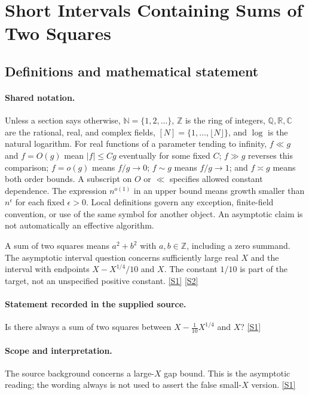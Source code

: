 \documentclass[11pt,a4paper]{article}
\newcommand{\N}{\mathbb{N}}
\newcommand{\Z}{\mathbb{Z}}
\newcommand{\Q}{\mathbb{Q}}
\newcommand{\R}{\mathbb{R}}
\newcommand{\C}{\mathbb{C}}
\newcommand{\sref}[2]{\hyperlink{source:#1:#2}{[S#2]}}
\begin{document}
\section{Short Intervals Containing Sums of Two Squares}\label{statement}


\subsection{Definitions and mathematical statement}

\paragraph{Shared notation.}Unless a section says otherwise, $\N=\{1,2,\ldots\}$,
$\Z$ is the ring of integers, $\Q,\R,\C$ are the rational, real, and complex
fields, $[N]=\{1,\ldots,\lfloor N\rfloor\}$, and $\log$ is the natural
logarithm. For real functions of a parameter tending to infinity,
$f\ll g$ and $f=O(g)$ mean $|f|\leq Cg$ eventually for some fixed $C$;
$f\gg g$ reverses this comparison; $f=o(g)$ means $f/g\to0$;
$f\sim g$ means $f/g\to1$; and $f\asymp g$ means both order bounds.
A subscript on $O$ or $\ll$ specifies allowed constant dependence.
The expression $n^{o(1)}$ in an upper bound means growth smaller than
$n^\epsilon$ for each fixed $\epsilon>0$. Local definitions govern any
exception, finite-field convention, or use of the same symbol for another
object. An asymptotic claim is not automatically an effective algorithm.



A sum of two squares means $a^2+b^2$ with $a,b\in\Z$, including a zero summand. The asymptotic interval question concerns sufficiently large real $X$ and the interval with endpoints $X-X^{1/4}/10$ and $X$. The constant $1/10$ is part of the target, not an unspecified positive constant. \sref{statement}{1} \sref{statement}{2}

\paragraph{Statement recorded in the supplied source.}
Is there always a sum of two squares between $X - \frac{1}{10}X^{1/4}$ and $X$? \sref{statement}{1}

\paragraph{Scope and interpretation.}

The source background concerns a large-$X$ gap bound. This is the asymptotic reading; the wording always is not used to assert the false small-$X$ version. \sref{statement}{1}
\end{document}
